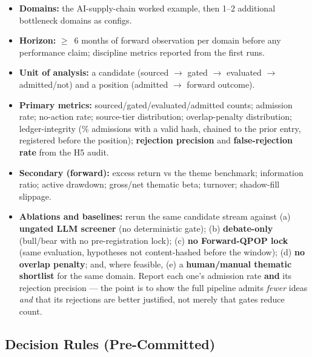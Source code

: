 \documentclass[11pt]{article}
\begin{document}
\begin{itemize}
  \item \textbf{Domains:} the AI-supply-chain worked example, then 1--2 additional bottleneck
    domains as configs.
  \item \textbf{Horizon:} $\geq$~6 months of forward observation per domain before any performance
    claim; discipline metrics reported from the first runs.
  \item \textbf{Unit of analysis:} a candidate (sourced $\to$ gated $\to$ evaluated $\to$
    admitted/not) and a position (admitted $\to$ forward outcome).
  \item \textbf{Primary metrics:} sourced/gated/evaluated/admitted counts; admission rate;
    no-action rate; source-tier distribution; overlap-penalty distribution; ledger-integrity
    (\% admissions with a valid hash, chained to the prior entry, registered before the position);
    \textbf{rejection precision} and \textbf{false-rejection rate} from the H5 audit.
  \item \textbf{Secondary (forward):} excess return vs the theme benchmark; information ratio;
    active drawdown; gross/net thematic beta; turnover; shadow-fill slippage.
  \item \textbf{Ablations and baselines:} rerun the same candidate stream against (a)
    \textbf{ungated LLM screener} (no deterministic gate); (b) \textbf{debate-only} (bull/bear
    with no pre-registration lock); (c) \textbf{no Forward-QPOP lock} (same evaluation,
    hypotheses not content-hashed before the window); (d) \textbf{no overlap penalty}; and, where
    feasible, (e) a \textbf{human/manual thematic shortlist} for the same domain. Report each
    one's admission rate \textbf{and} its rejection precision --- the point is to show the full
    pipeline admits \emph{fewer} ideas \emph{and} that its rejections are better justified, not
    merely that gates reduce count.
\end{itemize}

\subsection*{Decision Rules (Pre-Committed)}
\end{document}
